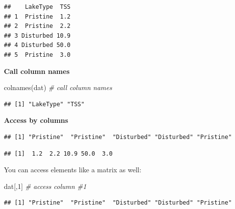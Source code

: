\documentclass[
]{book}
\newenvironment{Shaded}{\begin{snugshade}}{\end{snugshade}}
\newcommand{\CommentTok}[1]{\textcolor[rgb]{0.56,0.35,0.01}{\textit{#1}}}
\newcommand{\DecValTok}[1]{\textcolor[rgb]{0.00,0.00,0.81}{#1}}
\newcommand{\FunctionTok}[1]{\textcolor[rgb]{0.00,0.00,0.00}{#1}}
\newcommand{\NormalTok}[1]{#1}
\newcommand{\SpecialCharTok}[1]{\textcolor[rgb]{0.00,0.00,0.00}{#1}}
\begin{document}
\begin{verbatim}
##    LakeType  TSS
## 1  Pristine  1.2
## 2  Pristine  2.2
## 3 Disturbed 10.9
## 4 Disturbed 50.0
## 5  Pristine  3.0
\end{verbatim}

\textbf{Call column names}

\begin{Shaded}
\begin{Highlighting}[]
\FunctionTok{colnames}\NormalTok{(dat) }\CommentTok{\# call column names}
\end{Highlighting}
\end{Shaded}

\begin{verbatim}
## [1] "LakeType" "TSS"
\end{verbatim}

\textbf{Access by columns}

\begin{Shaded}
\end{Shaded}

\begin{verbatim}
## [1] "Pristine"  "Pristine"  "Disturbed" "Disturbed" "Pristine"
\end{verbatim}

\begin{Shaded}
\end{Shaded}

\begin{verbatim}
## [1]  1.2  2.2 10.9 50.0  3.0
\end{verbatim}

You can access elements like a matrix as well:

\begin{Shaded}
\begin{Highlighting}[]
\NormalTok{dat[,}\DecValTok{1}\NormalTok{] }\CommentTok{\# access column \#1}
\end{Highlighting}
\end{Shaded}

\begin{verbatim}
## [1] "Pristine"  "Pristine"  "Disturbed" "Disturbed" "Pristine"
\end{verbatim}
\end{document}
